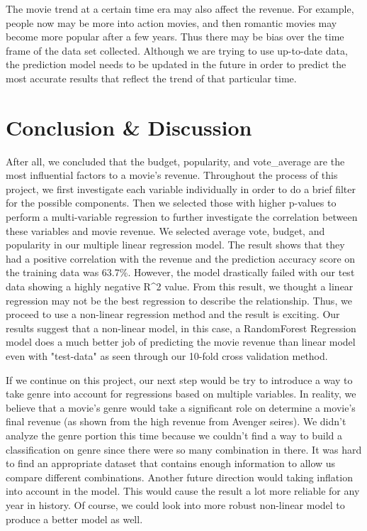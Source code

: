 \documentclass[11pt]{article}
\begin{document}
The movie trend at a certain time era may also affect the revenue. For
example, people now may be more into action movies, and then romantic
movies may become more popular after a few years. Thus there may be bias
over the time frame of the data set collected. Although we are trying to
use up-to-date data, the prediction model needs to be updated in the
future in order to predict the most accurate results that reflect the
trend of that particular time.

    \section{Conclusion \& Discussion}\label{conclusion-discussion}

    After all, we concluded that the budget, popularity, and vote\_average
are the most influential factors to a movie's revenue. Throughout the
process of this project, we first investigate each variable individually
in order to do a brief filter for the possible components. Then we
selected those with higher p-values to perform a multi-variable
regression to further investigate the correlation between these
variables and movie revenue. We selected average vote, budget, and
popularity in our multiple linear regression model. The result shows
that they had a positive correlation with the revenue and the prediction
accuracy score on the training data was 63.7\%. However, the model
drastically failed with our test data showing a highly negative R\^{}2
value. From this result, we thought a linear regression may not be the
best regression to describe the relationship. Thus, we proceed to use a
non-linear regression method and the result is exciting. Our results
suggest that a non-linear model, in this case, a RandomForest Regression
model does a much better job of predicting the movie revenue than linear
model even with "test-data" as seen through our 10-fold cross validation
method.

If we continue on this project, our next step would be try to introduce
a way to take genre into account for regressions based on multiple
variables. In reality, we believe that a movie's genre would take a
significant role on determine a movie's final revenue (as shown from the
high revenue from Avenger seires). We didn't analyze the genre portion
this time because we couldn't find a way to build a classification on
genre since there were so many combination in there. It was hard to find
an appropriate dataset that contains enough information to allow us
compare different combinations. Another future direction would taking
inflation into account in the model. This would cause the result a lot
more reliable for any year in history. Of course, we could look into
more robust non-linear model to produce a better model as well.
\end{document}
